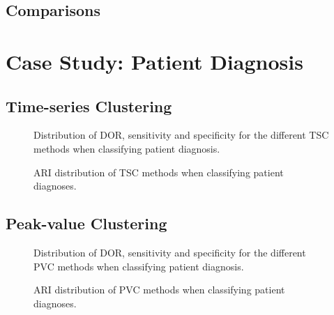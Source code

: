 \subsection{Comparisons}

\newpage

\section{Case Study: Patient Diagnosis}

\subsection{Time-series Clustering}

\begin{figure}[htb]
    \centering
    
    \caption{Distribution of DOR, sensitivity and specificity for the different TSC methods when classifying patient diagnosis.}
    \label{fig:tsc_ind_dor_sens_spec_dist}
\end{figure}

\begin{figure}[htb]
    \centering
    
    \caption{ARI distribution of TSC methods when classifying patient diagnoses.}
    \label{fig:tsc_ind_ari}
\end{figure}

\newpage

\subsection{Peak-value Clustering}

\begin{figure}[htb]
    \centering
    
    \caption{Distribution of DOR, sensitivity and specificity for the different PVC methods when classifying patient diagnosis.}
    \label{fig:pvc_ind_dor_sens_spec_dist}
\end{figure}

\begin{figure}[htb]
    \centering
    
    \caption{ARI distribution of PVC methods when classifying patient diagnoses.}
    \label{fig:pvc_ind_ari}
\end{figure}

